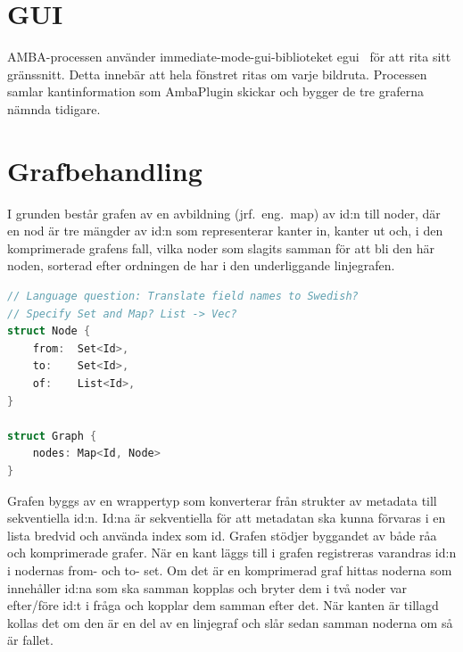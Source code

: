 
\section{GUI}

AMBA-processen använder immediate-mode-gui-biblioteket egui~\cite{egui} för att
rita sitt gränssnitt. Detta innebär att hela fönstret ritas om varje bildruta.
Processen samlar kantinformation som AmbaPlugin skickar och bygger de tre
graferna nämnda tidigare.

\section{Grafbehandling}

I grunden består grafen av en avbildning (jrf.\ eng.\ map) av id:n till noder,
där en nod är tre mängder av id:n som representerar kanter in, kanter ut och, i
den komprimerade grafens fall, vilka noder som slagits samman för att bli den
här noden, sorterad efter ordningen de har i den underliggande linjegrafen.

\begin{lstlisting}[label={list:third}, language=Swift]
// Language question: Translate field names to Swedish?
// Specify Set and Map? List -> Vec?
struct Node {
    from:  Set<Id>,
    to:    Set<Id>,
    of:    List<Id>,
}

struct Graph {
    nodes: Map<Id, Node>
}
\end{lstlisting}

Grafen byggs av en wrappertyp som konverterar från strukter av metadata till
sekventiella id:n. Id:na är sekventiella för att metadatan ska kunna förvaras i
en lista bredvid och använda index som id. Grafen stödjer byggandet av både råa
och komprimerade grafer. När en kant läggs till i grafen registreras varandras
id:n i nodernas from- och to- set. Om det är en komprimerad graf hittas noderna
som innehåller id:na som ska samman kopplas och bryter dem i två noder var
efter/före id:t i fråga och kopplar dem samman efter det. När kanten är tillagd
kollas det om den är en del av en linjegraf och slår sedan samman noderna om så
är fallet.

